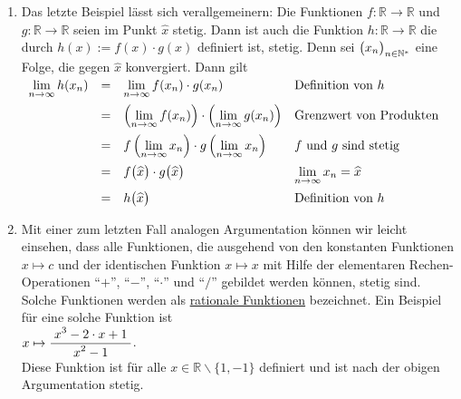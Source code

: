 \begin{enumerate}
      $\lim\limits_{n\rightarrow\infty} f(x_n) = 
       \lim\limits_{n\rightarrow\infty} (x_n \cdot x_n) = 
       \left(\lim\limits_{n\rightarrow\infty} x_n\right) \cdot\left(\lim\limits_{n\rightarrow\infty} x_n\right) =
       \widehat{x} \cdot \widehat{x} = \widehat{x}^2$.
\item Das letzte Beispiel l\"asst sich verallgemeinern: Die Funktionen
      $f:\mathbb{R} \rightarrow \mathbb{R}$ und $g:\mathbb{R} \rightarrow \mathbb{R}$
      seien im Punkt $\widehat{x}$ stetig.  Dann ist auch die Funktion
      $h: \mathbb{R} \rightarrow \mathbb{R}$ die durch $h(x) := f(x) \cdot g(x)$
      definiert ist, stetig.  Denn sei $\bigl(x_n\bigr)_{n\in\mathbb{N}^*}$ eine Folge, die gegen $\widehat{x}$
      konvergiert.  Dann gilt
      \\[0.2cm]
      \hspace*{1.3cm}      
      $
      \begin{array}[t]{lcll}
            \lim\limits_{n\rightarrow\infty} h(x_n) 
      & = & \lim\limits_{n\rightarrow\infty} f(x_n) \cdot g(x_n) & \mbox{Definition von $h$} \\[0.3cm] 
      & = & \left(\lim\limits_{n\rightarrow\infty} f(x_n)\right) \cdot \left(\lim\limits_{n\rightarrow\infty} g(x_n)\right) &
            \mbox{Grenzwert von Produkten} \\[0.3cm] 
      & = & f\left(\lim\limits_{n\rightarrow\infty} x_n\right) \cdot g\left(\lim\limits_{n\rightarrow\infty} x_n\right) &
            \mbox{$f$ und $g$ sind stetig} \\[0.3cm] 
      & = & f\bigl(\widehat{x}\bigr) \cdot g\bigl(\widehat{x}\bigr) &
            \lim\limits_{n\rightarrow\infty} x_n = \widehat{x} \\[0.3cm] 
      & = & h\bigl(\widehat{x}\bigr) & \mbox{Definition von $h$}
      \end{array}
      $
      
\item Mit einer zum letzten Fall analogen Argumentation k\"onnen wir leicht einsehen, dass alle Funktionen,
      die ausgehend von den konstanten Funktionen $x \mapsto c$ und der identischen
      Funktion $x \mapsto x$ mit Hilfe der elementaren Rechen-Operationen 
      ``$+$'', ``$-$'', ``$\cdot $'' und ``$/$'' gebildet werden k\"onnen, stetig sind.  Solche
      Funktionen werden als \href{http://de.wikipedia.org/wiki/Rationale_Funktion}{rationale Funktionen} bezeichnet.
      Ein       Beispiel f\"ur eine solche Funktion ist 
      \\[0.2cm]
      \hspace*{1.3cm}      
      $x \mapsto \displaystyle\frac{\;\displaystyle x^3 - 2\cdot x +1\;}{\;\displaystyle x^2 -1\;}$.
      \\[0.2cm]
      Diese Funktion ist f\"ur alle $x\in\mathbb{R} \backslash \{1,-1\}$ definiert und ist
      nach der obigen Argumentation stetig.



\end{enumerate}

